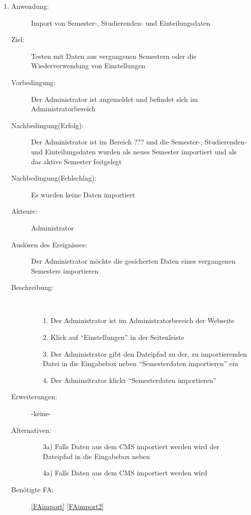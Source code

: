 \documentclass[parskip=full]{scrartcl}
\newcommand{\swtLabel}[1]{\textbf{/#1\arabic*0/}}
\begin{document}
\begin{enumerate} [label=\swtLabel{A}]
    \item \label{UCadminImport}
    \begin{description}
    \item[Anwendung:] Import von Semester-, Studierenden- und
    Einteilungsdaten
    \item[Ziel:] Testen mit Daten aus vergangenen Semestern oder die
    Wiederverwendung von Einstellungen
    \item[Vorbedingung:] Der Administrator ist angemeldet und befindet sich im
    Administratorbereich
    \item[Nachbedingung(Erfolg):] Der Administrator ist im Bereich
    ??? und  die Semester-, Studierenden- und
    Einteilungsdaten wurden als neues Semester importiert und als das aktive
    Semester festgelegt
    \item[Nachbedingung(Fehlschlag):] Es wurden keine Daten importiert
    \item[Akteure:] Administrator
    \item[Auslösen des Ereignisses:] Der Administrator möchte die gesicherten
    Daten eines vergangenen Semesters importieren
    \item[Beschreibung:]~
    \begin{enumerate}
      \item[1.] Der Administrator ist im Administratorbereich der Webseite
      \item[2.] Klick auf \enquote{Einstellungen} %
      in der Seitenleiste
       \item[3.] Der Administrator gibt den Dateipfad zu der, zu importierenden
       Datei in die Eingabebox neben \enquote{Semesterdaten importieren} ein
      \item[4.] Der Adminsitrator klickt \enquote{Semesterdaten importieren}
      
    \end{enumerate}
    \item[Erweiterungen:] -keine-
    \item[Alternativen:] 
        
        \begin{enumerate}
          \item [3a)] Falls Daten aus dem \gls{CMS} importiert werden wird der
          Dateipfad in die Eingabebox neben %
          \item [4a)]Falls Daten aus dem \gls{CMS} importiert werden wird %
        \end{enumerate}
    \item[Benötigte FA:] \ref{FAimport} \ref{FAimport2}
  \end{description}
  

\end{enumerate}
\end{document}
